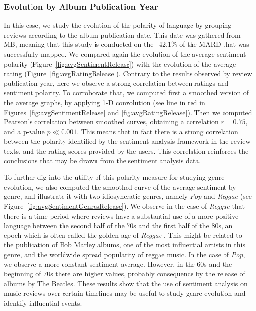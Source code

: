 \subsubsection{Evolution by Album Publication Year}

In this case, we study the evolution of the polarity of language by grouping reviews according to the album publication date. This date was gathered from MB, meaning that this study is conducted on the ~42,1\% of the MARD that was successfully mapped. We compared again the evolution of the average sentiment polarity (Figure~\ref{fig:avgSentimentRelease}) with the evolution of the average rating (Figure~\ref{fig:avgRatingRelease}). Contrary to the results observed by review publication year, here we observe a strong correlation between ratings and sentiment polarity. To corroborate that, we computed first a smoothed version of the average graphs, by applying 1-D convolution (see line in red in Figures~\ref{fig:avgSentimentRelease} and \ref{fig:avgRatingRelease}). Then we computed Pearson's correlation between smoothed curves, obtaining a correlation $r = 0.75$, and a p-value $p \ll 0.001$. This means that in fact there is a strong correlation between the polarity identified by the sentiment analysis framework in the review texts, and the rating scores provided by the users. This correlation reinforces the conclusions that may be drawn from the sentiment analysis data. %

To further dig into the utility of this polarity measure for studying genre evolution, we also computed the smoothed curve of the average sentiment by genre, and illustrate it with two idiosyncratic genres, namely \textit{Pop} and \textit{Reggae} (see  Figure~\ref{fig:avgSentimentGenresRelease}). We observe in the case of \textit{Reggae} that there is a time period where reviews have a substantial use of a more positive language between the second half of the 70s and the first half of the 80s, an epoch which is often called the golden age of \textit{Reggae} \cite{alleyne2012encyclopedia}. This might be related to the publication of Bob Marley albums, one of the most influential artists in this genre, and the worldwide spread popularity of reggae music. In the case of \textit{Pop}, we observe a more constant sentiment average. However, in the 60s and the beginning of 70s there are higher values, probably consequence by the release of albums by The Beatles. These results show that the use of sentiment analysis on music reviews over certain timelines may be useful to study genre evolution and identify influential events.


